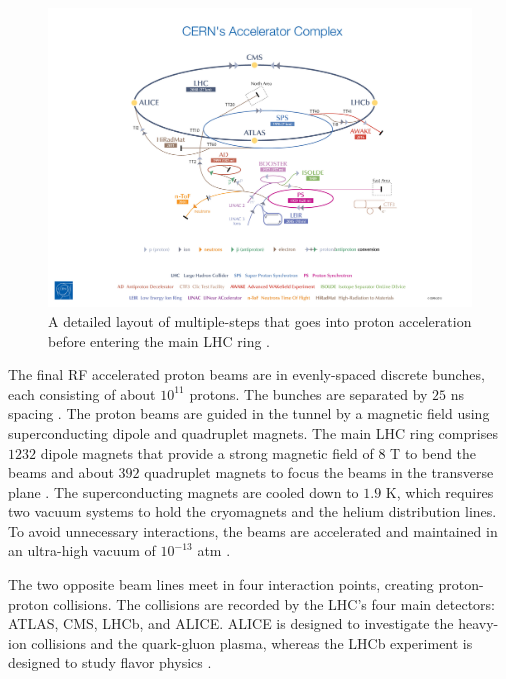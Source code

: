 \begin{figure}[!htbp]
    \centering
    \includegraphics[width=1.2\linewidth]{figures/LHC/ProtonAccelerator.jpeg}
    \caption{ A detailed layout of multiple-steps that goes into proton acceleration before entering the main LHC ring \cite{ProtonAcclerator}.\label{fig:ProtonAcc}}
\end{figure}

The final RF accelerated proton beams are in evenly-spaced discrete bunches, each consisting of about $10^{11}$ protons. The bunches are separated by $25$ ns spacing \cite{LHCGuide}. The proton beams are guided in the tunnel by a magnetic field using superconducting dipole and quadruplet magnets. The main LHC ring comprises $1232$ dipole magnets that provide a strong magnetic field of $8$ T to bend the beams and about $392$ quadruplet magnets to focus the beams in the transverse plane \cite{LHCGuide}. The superconducting magnets are cooled down to $1.9$ K, which requires two vacuum systems to hold the cryomagnets and the helium distribution lines. To avoid unnecessary interactions, the beams are accelerated and maintained in an ultra-high vacuum of $10^{-13}$ atm \cite{LHCGuide}. 

The two opposite beam lines meet in four interaction points, creating proton-proton collisions. The collisions are recorded by the LHC's four main detectors: ATLAS, CMS, LHCb, and ALICE. ALICE is designed to investigate the heavy-ion collisions and the quark-gluon plasma, whereas the LHCb experiment is designed to study flavor physics \cite{LHCGuide}.